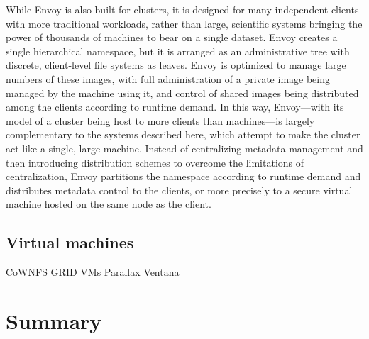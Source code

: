 While Envoy is also built for clusters, it is designed for many independent clients with more traditional workloads, rather than large, scientific systems bringing the power of thousands of machines to bear on a single dataset. Envoy creates a single hierarchical namespace, but it is arranged as an administrative tree with discrete, client-level file systems as leaves. Envoy is optimized to manage large numbers of these images, with full administration of a private image being managed by the machine using it, and control of shared images being distributed among the clients according to runtime demand. In this way, Envoy---with its model of a cluster being host to more clients than machines---is largely complementary to the systems described here, which attempt to make the cluster act like a single, large machine. Instead of centralizing metadata management and then introducing distribution schemes to overcome the limitations of centralization, Envoy partitions the namespace according to runtime demand and distributes metadata control to the clients, or more precisely to a secure virtual machine hosted on the same node as the client.

\subsection{Virtual machines}



CoWNFS \cite{kotsovinos04b}
GRID VMs \cite{zhao04} \cite{figueiredo01}
Parallax \cite{warfield}
Ventana \cite{pfaff}


\section{Summary}
